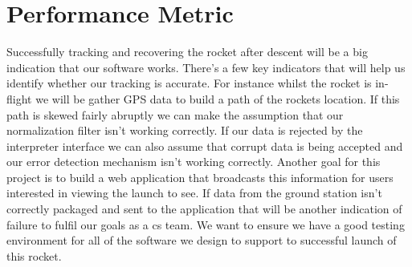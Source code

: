 \documentclass[onecolumn, draftclsnofoot,10pt, compsoc]{IEEEtran}
\begin{document}
\section{Performance Metric}
Successfully tracking and recovering the rocket after descent will be a big indication that our software works. There’s a few key indicators that will help us identify whether our tracking is accurate. For instance whilst the rocket is in-flight we will be gather GPS data to build a path of the rockets location. If this path is skewed fairly abruptly we can make the assumption that our normalization filter isn’t working correctly. If our data is rejected by the interpreter interface we can also assume that corrupt data is being accepted and our error detection mechanism isn’t working correctly. Another goal for this project is to build a web application that broadcasts this information for users interested in viewing the launch to see. If data from the ground station isn’t correctly packaged and sent to the application that will be another indication of failure to fulfil our goals as a cs team. We want to ensure we have a good testing environment for all of the software we design to support to successful launch of this rocket. 
\end{document}
